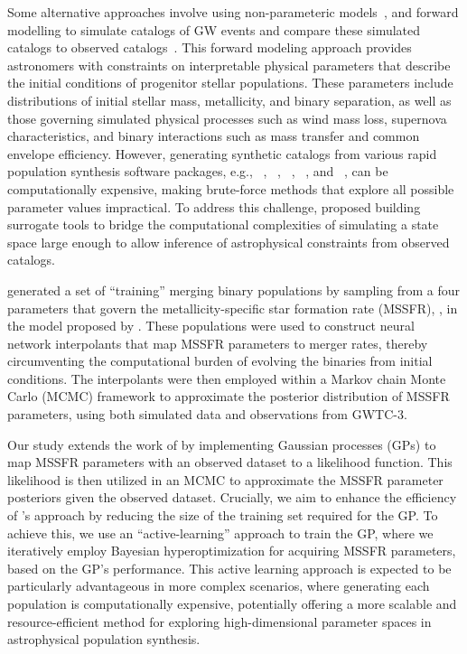 \documentclass[twocolumn]{aastex631}
\begin{document}
Some alternative approaches involve using non-parameteric models~\citep{Li:2021:ApJ, Rinaldi:2024:A&A, Heinzel:2024:arXiv, Callister:2024:PhRvX}, and forward modelling to simulate catalogs of GW events and compare these simulated catalogs to observed catalogs~\citep{Wong:2023:ApJ, Riley:2023:ApJ}. 
This forward modeling approach provides astronomers with constraints on interpretable physical parameters that describe the initial conditions of progenitor stellar populations. 
These parameters include distributions of initial stellar mass, metallicity, and binary separation, as well as those governing simulated physical processes such as wind mass loss, supernova characteristics, and binary interactions such as mass transfer and common envelope efficiency.
However, generating synthetic catalogs from various rapid population synthesis software packages, e.g., \COMPAS~\citep{Compas:2022:JOSS}, \BPASS~\citep{BPASS:2017:PASA}, \COSMIC~\citep{COSMIC:2020:ApJ}, \STARTRACK~\citep{StarTrack:2008:ApJS}, and \POSYDEN~\citep{POSYDON:2023:ApJS}, can be computationally expensive, making brute-force methods that explore all possible parameter values impractical. 
To address this challenge, \citet{Riley:2023:ApJ} proposed building surrogate tools to bridge the computational complexities of simulating a state space large enough to allow inference of astrophysical constraints from observed catalogs.

\citet{Riley:2023:ApJ} generated a set of ``training'' merging binary populations by sampling from a four parameters that govern the metallicity-specific star formation rate (MSSFR), \MSSFR, in the model proposed by \citet{Neijssel_2019}. 
These populations were used to construct neural network interpolants that map MSSFR parameters to merger rates, thereby circumventing the computational burden of evolving the binaries from initial conditions.
The interpolants were then employed within a Markov chain Monte Carlo (MCMC) framework to approximate the posterior distribution of MSSFR parameters, using both simulated data and observations from GWTC-3.

Our study extends the work of \citet{Riley:2023:ApJ} by implementing Gaussian processes (GPs) to map MSSFR parameters with an observed dataset to a likelihood function. 
This likelihood is then utilized in an MCMC to approximate the MSSFR parameter posteriors given the observed dataset. 
Crucially, we aim to enhance the efficiency of \citet{Riley:2023:ApJ}'s approach by reducing the size of the training set required for the GP. 
To achieve this, we use an ``active-learning'' approach to train the GP, where we iteratively employ Bayesian hyperoptimization for acquiring MSSFR parameters, based on the GP's performance.
This active learning approach is expected to be particularly advantageous in more complex scenarios, where generating each population is computationally expensive, potentially offering a more scalable and resource-efficient method for exploring high-dimensional parameter spaces in astrophysical population synthesis.
\end{document}
